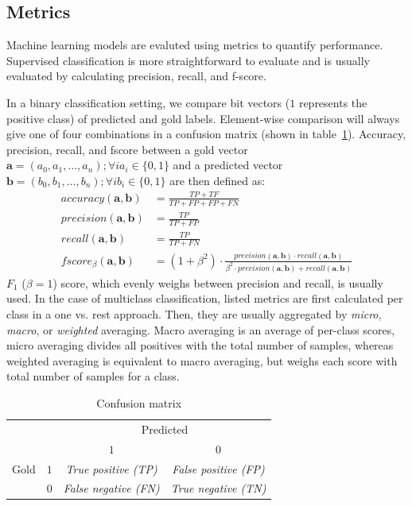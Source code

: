 \subsection{Metrics}
\label{sec:metrics}

Machine learning models are evaluted using metrics to quantify
performance. Supervised classification is more straightforward 
to evaluate and is usually evaluated by calculating  
precision, recall, and f-score. 

In a binary classification setting, we compare bit vectors ($1$ represents the
positive class) of predicted and gold labels. Element-wise comparison will
always give one of four combinations in a confusion matrix (shown in
table~\ref{tab:conf_mat}). Accuracy, precision, recall, and fscore between 
a gold vector $\mathbf{a} = (a_0, a_1, \dots, a_n); \forall i a_i \in \{0, 1\}$ 
and a predicted vector 
$\mathbf{b} = (b_0, b_1, \dots, b_n); \forall i b_i \in \{0, 1\}$
are then defined as:
\begin{align*}
	accuracy(\mathbf{a, b}) &= \frac{TP + TF}{TP + FP + FP + FN} \\
	precision(\mathbf{a, b}) &= \frac{TP}{TP + FP} \\
	recall(\mathbf{a, b}) &= \frac{TP}{TP + FN} \\
	fscore_{\beta}(\mathbf{a, b}) &= (1 + \beta^2) 
	\cdot \frac{precision(\mathbf{a, b}) \cdot recall(\mathbf{a, b})}
	{\beta^2 \cdot precision(\mathbf{a, b}) + recall(\mathbf{a, b})}
\end{align*}
$F_1$ ($\beta = 1$) score, which evenly weighs between 
precision and recall, is usually used.
In the case of multiclass classification, listed metrics are first calculated 
per class in a one vs. rest approach. Then, they are usually 
aggregated by
\textit{micro}, \textit{macro}, or \textit{weighted} averaging. Macro
averaging is an average of per-class scores, micro
averaging divides all positives with the total number of 
samples, whereas weighted averaging is equivalent to macro averaging,
but weighs each score with total number of samples for a class. 

\begin{table}
	\centering
	\begin{tabular}{c c|c c}
	\toprule
	& & \multicolumn{2}{c}{Predicted} \\
	\multirow{4}{*}{Gold} & & $1$ & $0$ \\ \hline
	& $1$ & \textit{True positive (TP)} & \textit{False positive (FP)} \\
		& $0$ & \textit{False negative (FN)} & \textit{True negative (TN)} \\
	\bottomrule
\end{tabular}
	\caption{Confusion matrix}
	\label{tab:conf_mat}
\end{table}

